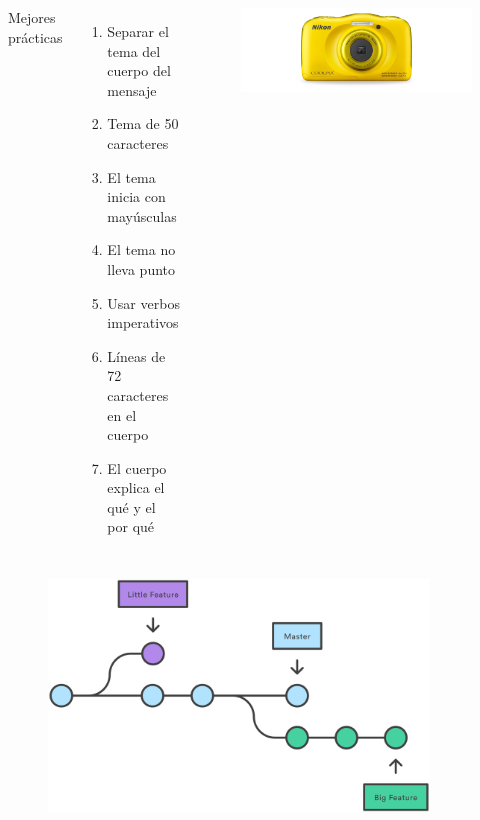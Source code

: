 \documentclass{beamer}
\begin{document}
\begin{frame}
  \resizebox{0.7\textwidth}{!}{\FiraTitle \color{purple}{git commit}}
  \vspace{2em}

  \begin{columns}
    {\FiraTitle Mejores prácticas}
    \begin{enumerate}
    \item Separar el tema del cuerpo del mensaje
    \item Tema de 50 caracteres
    \item El tema inicia con mayúsculas
    \item El tema no lleva punto
    \item Usar verbos imperativos
    \item Líneas de 72 caracteres en el cuerpo
    \item El cuerpo explica el qué y el por qué
    \end{enumerate}

    \begin{figure}
      \centering
      \includegraphics[width=\textwidth]{camera}
    \end{figure}
  \end{columns}
\end{frame}

\begin{frame}
  \begin{center}
    \resizebox{0.7\textwidth}{!}{\FiraTitle \color{green}{Branching}}
  \end{center}
  \begin{figure}
    \centering
    \includegraphics[width=0.9\textwidth]{ramas}
  \end{figure}
\end{frame}
\end{document}
